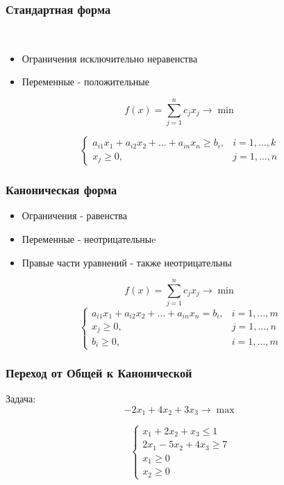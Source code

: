 \documentclass[12pt]{beamer}
\begin{document}
	\begin{frame}
		\frametitle{Стандартная форма}
		\
		\begin{itemize}
			\item Ограничения исключительно неравенства
			\item Переменные - положительные
		\end{itemize}
		
		\begin{equation*}
			f(x)=\sum_{j=1}^n c_j x_j \to \min
		\end{equation*}
		
		\begin{equation*}
			\begin{cases}	
				a_{i1}x_1+a_{i2}x_2+\dots + a_{in} x_n \geq b_i, &  i=1,\dots, k\\
				x_j\geq0, & j=1,\dots,n
			\end{cases}
		\end{equation*}
	\end{frame}
	\begin{frame}
		\frametitle{Каноническая форма}
		\begin{itemize}
			\item Ограничения - равенства
			\item Переменные - неотрицательныe
			\item Правые части уравнений - также неотрицательны
		\end{itemize}
		\begin{equation*}
			f(x)=\sum_{j=1}^n c_j x_j \to \min
		\end{equation*}
		\begin{equation*}
			\begin{cases}	
				a_{i1}x_1+a_{i2}x_2+\dots +a_{in} x_n = b_i, &i=1,\dots,m\\
				x_j\geq0, & j=1,\dots,n\\
				b_i\geq0, & i=1,\dots,m
			\end{cases}
		\end{equation*}
	\end{frame}
	\begin{frame}
		\frametitle{Переход от Общей к Канонической}
		Задача: 
		\begin{equation*}
			-2x_1+4x_2+3x_3 \to \max
		\end{equation*}
		
		\begin{equation*}
			\begin{cases}	
				x_1+2x_2+x_3\leq 1\\
				2x_1-5x_2+4x_3\geq 7\\
				x_1\geq0\\
				x_2\geq0
			\end{cases}
		\end{equation*}
	\end{frame}
\end{document}
